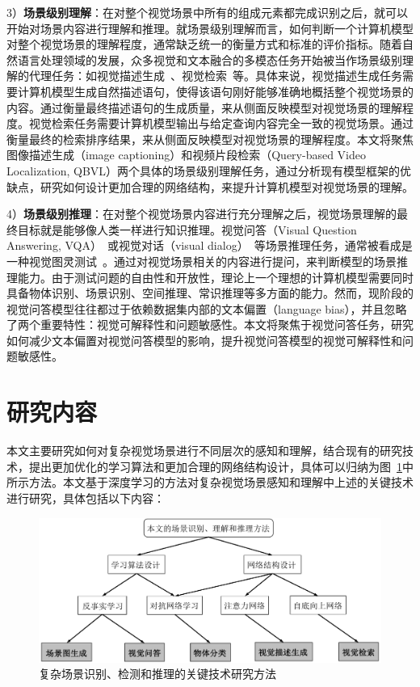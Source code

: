 3）\textbf{场景级别理解}：在对整个视觉场景中所有的组成元素都完成识别之后，就可以开始对场景内容进行理解和推理。就场景级别理解而言，如何判断一个计算机模型对整个视觉场景的理解程度，通常缺乏统一的衡量方式和标准的评价指标。随着自然语言处理领域的发展，众多视觉和文本融合的多模态任务开始被当作场景级别理解的代理任务：如视觉描述生成~\cite{vinyals2015show}、视觉检索~\cite{gao2017tall}等。具体来说，视觉描述生成任务需要计算机模型生成自然描述语句，使得该语句刚好能够准确地概括整个视觉场景的内容。通过衡量最终描述语句的生成质量，来从侧面反映模型对视觉场景的理解程度。视觉检索任务需要计算机模型输出与给定查询内容完全一致的视觉场景。通过衡量最终的检索排序结果，来从侧面反映模型对视觉场景的理解程度。本文将聚焦图像描述生成（image captioning）和视频片段检索（Query-based Video Localization, QBVL）两个具体的场景级别理解任务，通过分析现有模型框架的优缺点，研究如何设计更加合理的网络结构，来提升计算机模型对视觉场景的理解。

4）\textbf{场景级别推理}：在对整个视觉场景内容进行充分理解之后，视觉场景理解的最终目标就是能够像人类一样进行知识推理。视觉问答（Visual Question Answering, VQA）~\cite{antol2015vqa}或视觉对话（visual dialog）~\cite{das2017visual}等场景推理任务，通常被看成是一种视觉图灵测试~\cite{malinowski2014towards,geman2015visual}。通过对视觉场景相关的内容进行提问，来判断模型的场景推理能力。由于测试问题的自由性和开放性，理论上一个理想的计算机模型需要同时具备物体识别、场景识别、空间推理、常识推理等多方面的能力。然而，现阶段的视觉问答模型往往都过于依赖数据集内部的文本偏置（language bias），并且忽略了两个重要特性：视觉可解释性和问题敏感性。本文将聚焦于视觉问答任务，研究如何减少文本偏置对视觉问答模型的影响，提升视觉问答模型的视觉可解释性和问题敏感性。


\section{研究内容}

本文主要研究如何对复杂视觉场景进行不同层次的感知和理解，结合现有的研究技术，提出更加优化的学习算法和更加合理的网络结构设计，具体可以归纳为图~\ref{ch1:fig:technique_summary}中所示方法。本文基于深度学习的方法对复杂视觉场景感知和理解中上述的关键技术进行研究，具体包括以下内容：

\begin{figure}[t]
    \centering
        \includegraphics[width=0.95\linewidth]{chapter1/res/technique_summary.pdf}
    \centering
    \caption{复杂场景识别、检测和推理的关键技术研究方法}
    \label{ch1:fig:technique_summary}
\end{figure}

